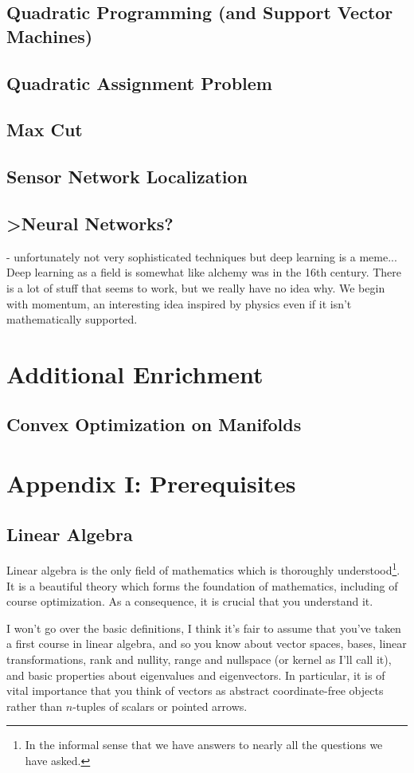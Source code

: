 \documentclass{article}
\numberwithin{equation}{section}
\theoremstyle{definition}
\begin{document}
\subsection{Quadratic Programming (and Support Vector Machines)}
\subsection{Quadratic Assignment Problem}
\subsection{Max Cut}
\subsection{Sensor Network Localization}
\subsection{>Neural Networks?}
- unfortunately not very sophisticated techniques but deep learning is a meme... Deep learning as a field is somewhat like alchemy was in the 16th century. There is a lot of stuff that seems to work, but we really have no idea why. We begin with momentum, an interesting idea inspired by physics even if it isn't mathematically supported.
\section{Additional Enrichment}
\subsection{Convex Optimization on Manifolds}
\appendix
\section{Appendix I: Prerequisites}
\subsection{Linear Algebra}
Linear algebra is the only field of mathematics which is thoroughly understood\footnote{In the informal sense that we have answers to nearly all the questions we have asked.}. It is a beautiful theory which forms the foundation of mathematics, including of course optimization. As a consequence, it is crucial that you understand it.

I won't go over the basic definitions, I think it's fair to assume that you've taken a first course in linear algebra, and so you know about vector spaces, bases, linear transformations, rank and nullity, range and nullspace (or kernel as I'll call it), and basic properties about eigenvalues and eigenvectors. In particular, it is of vital importance that you think of vectors as abstract coordinate-free objects rather than $n$-tuples of scalars or pointed arrows.
\end{document}
